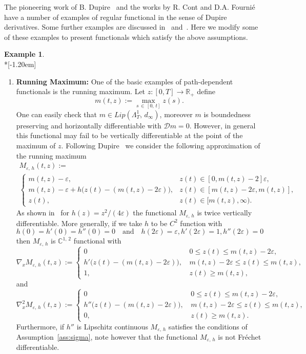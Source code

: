 \documentclass[10pt]{amsart}
\theoremstyle{definition}\newtheorem{defi}[theo]{Definition}\newtheorem{rema}[theo]{Remark}\newtheorem{exam}[theo]{Example}\newtheorem{exem}[theo]{Example}\newtheorem{nota}[theo]{Notation}
\newcommand{\epsi}{\varepsilon}
\newcommand{\bbC}{\mathbb{C}}
\newcommand{\calD}{\mathcal{D}}
\newcommand{\Rr}{{\mathbb{R}}}
\begin{document}
The pioneering work of B. Dupire~\cite{D09} and the works by R. Cont and D.A. Fournié~\cite{CF10B,CF09,ContFournie2013} have a number of examples of regular functional in the sense of Dupire derivatives. Some further examples are discussed in~\cite{ContKalinin} and~\cite{Kalinin}. Here we modify some of these examples to present functionals which satisfy the above assumptions.

\vspace{10pt}
\pagebreak
\begin{exam}\ \\*[-1.20em]
\begin{enumerate}
\item {\bf{Running Maximum}:} One of the basic examples of path-dependent functionals is the running maximum. Let $z\colon[0,T]\to \Rr_+$ define
\[
m(t, z):=\max_{s\,\in\,[0,\,t]}z(s).
\]
One can easily check that $m\in Lip(\Lambda^{1}_T,\,d_{\infty})$, moreover $m$ is boundedness preserving and horizontally differentiable with $\calD m=0.$ However, in general this functional may fail to be vertically differentiable at the point of the maximum of $z$. Following Dupire~\cite{D09} we consider the following approximation of the running maximum
\begin{multline*}
M_{\epsi,\,h}(t, z):=\\
\begin{cases}
m(t, z)-\epsi, &z(t)\in [0, m(t, z)-2]\epsi,\\
m(t, z)-\epsi+h\big(z(t)-(m(t, z)-2\epsi)\big), & z(t)\in [m(t, z)-2\epsi, m(t, z)],\\
z(t), &z(t)\in [m(t, z), \infty).
\end{cases}
\end{multline*}
As shown in~\cite{D09} for $h(z)=z^2/(4\epsi)$ the functional $M_{\epsi,\,h}$ is twice vertically differentiable. More generally, if we take $h$ to be $C^2$ function with
\[
h(0)=h'(0)=h''(0)=0\quad\text{and}\quad h(2\epsi)=\epsi, h'(2\epsi)=1, h''(2\epsi)=0
\]
then $M_{\epsi,\,h}$ is $\bbC^{1,\,2}$ functional with
\[
\nabla_x M_{\epsi,\,h}(t, z):=
\begin{cases}
0\, &0\leq z(t)\leq m(t, z)-2\epsi,\\
h'\big(z(t)-(m(t, z)-2\epsi)\big),\, &m(t, z)-2\epsi\leq z(t)\leq m(t, z),\\
1,\, &z(t)\geq m(t, z),
\end{cases}
\]
and
\[
\nabla^2_x M_{\epsi,\,h}(t, z):=
\begin{cases}
0\, &0\leq z(t)\leq m(t, z)-2\epsi,\\
h''\big(z(t)-(m(t, z)-2\epsi)\big),\, &m(t, z)-2\epsi\leq z(t)\leq m(t, z),\\
0,\, &z(t)\geq m(t, z).
\end{cases}
\]
Furthermore, if $h''$ is Lipschitz continuous $M_{\epsi,\,h}$ satisfies the conditions of Assumption~\ref{ass:sigma}, note however that the functional $M_{\epsi,\,h}$ is not Fréchet differentiable.


\end{enumerate}
\end{exam}
\end{document}
